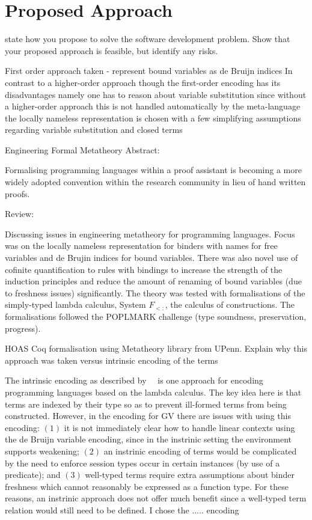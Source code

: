 \documentclass{mprop}
\begin{document}
\section{Proposed Approach}

state how you propose to solve the software development problem. Show that
your proposed approach is feasible, but identify any risks.

First order approach taken - represent bound variables as de Bruijn indices
In contrast to a higher-order approach
though the first-order encoding has its disadvantages namely one has to reason about variable substitution since without a higher-order approach this is not handled automatically by the meta-language
the locally nameless representation is chosen with a few simplifying assumptions regarding variable substitution and closed terms

Engineering Formal Metatheory
Abstract:

Formalising programming languages within a proof assistant is becoming a
more widely adopted convention within the research community in lieu of hand
written proofs.

Review:

Discussing issues in engineering metatheory for programming languages.
Focus was on the locally nameless representation for binders with names
for free variables and de Brujin indices for bound variables. There was
also novel use of cofinite quantification to rules with bindings to increase
the strength of the induction principles and reduce the amount of renaming
of bound variables (due to freshness issues) significantly. The theory was
tested with formalisations of the simply-typed lambda calculus,
System $F_{<:}$,
the calculus of constructions. The formalisations followed the POPLMARK
challenge (type soundness, preservation, progress).


HOAS Coq formalisation using Metatheory library from UPenn.
Explain why this approach was taken versus intrinsic encoding of the terms

The intrinsic encoding as described by~\citeauthor{Benton:2012:STT}~\cite{Benton:2012:STT} is one approach for encoding programming languages based on the lambda calculus. The key idea here is that terms are indexed by their type so as to prevent ill-formed terms from being constructed. However, in the encoding for GV there are issues with using this encoding: $(1)$ it is not immediately clear how to handle linear contexts using the de Bruijn variable encoding, since in the instrinic setting the environment supports weakening; $(2)$ an instrinic encoding of terms would be complicated by the need to enforce session types occur in certain instances (by use of a predicate); and $(3)$ well-typed terms require extra assumptions about binder freshness which cannot reasonably be expressed as a function type. For these reasons, an instrinic approach does not offer much benefit since a well-typed term relation would still need to be defined. I chose the ..... encoding
\end{document}
